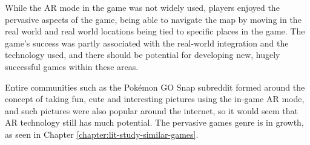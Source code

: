 While the AR mode in the game was not widely used, players enjoyed the pervasive aspects of the game, being able to navigate the map by moving in the real world and real world locations being tied to specific places in the game. The game's success was partly associated with the real-world integration and the technology used, and there should be potential for developing new, hugely successful games within these areas.

Entire communities such as the Pokémon GO Snap subreddit formed around the concept of taking fun, cute and interesting pictures using the in-game AR mode, and such pictures were also popular around the internet, so it would seem that AR technology still has much potential. The pervasive games genre is in growth, as seen in Chapter \ref{chapter:lit-study-similar-games}.
